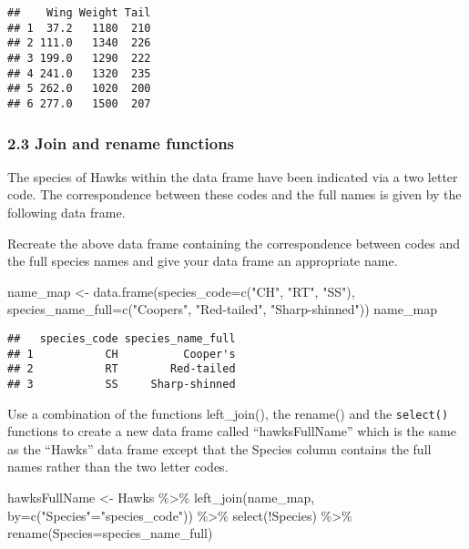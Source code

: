 \documentclass[
]{article}
\newenvironment{Shaded}{\begin{snugshade}}{\end{snugshade}}
\newcommand{\AttributeTok}[1]{\textcolor[rgb]{0.77,0.63,0.00}{#1}}
\newcommand{\FunctionTok}[1]{\textcolor[rgb]{0.00,0.00,0.00}{#1}}
\newcommand{\NormalTok}[1]{#1}
\newcommand{\OtherTok}[1]{\textcolor[rgb]{0.56,0.35,0.01}{#1}}
\newcommand{\SpecialCharTok}[1]{\textcolor[rgb]{0.00,0.00,0.00}{#1}}
\newcommand{\StringTok}[1]{\textcolor[rgb]{0.31,0.60,0.02}{#1}}
\begin{document}
\begin{verbatim}
##    Wing Weight Tail
## 1  37.2   1180  210
## 2 111.0   1340  226
## 3 199.0   1290  222
## 4 241.0   1320  235
## 5 262.0   1020  200
## 6 277.0   1500  207
\end{verbatim}

\hypertarget{join-and-rename-functions}{%
\subsubsection{2.3 Join and rename
functions}\label{join-and-rename-functions}}

The species of Hawks within the data frame have been indicated via a two
letter code. The correspondence between these codes and the full names
is given by the following data frame.

Recreate the above data frame containing the correspondence between
codes and the full species names and give your data frame an appropriate
name.

\begin{Shaded}
\begin{Highlighting}[]
\NormalTok{name\_map }\OtherTok{\textless{}{-}} \FunctionTok{data.frame}\NormalTok{(}\AttributeTok{species\_code=}\FunctionTok{c}\NormalTok{(}\StringTok{"CH"}\NormalTok{, }\StringTok{"RT"}\NormalTok{, }\StringTok{"SS"}\NormalTok{), }\AttributeTok{species\_name\_full=}\FunctionTok{c}\NormalTok{(}\StringTok{"Cooper\textquotesingle{}s"}\NormalTok{, }\StringTok{"Red{-}tailed"}\NormalTok{, }\StringTok{"Sharp{-}shinned"}\NormalTok{))}
\NormalTok{name\_map}
\end{Highlighting}
\end{Shaded}

\begin{verbatim}
##   species_code species_name_full
## 1           CH          Cooper's
## 2           RT        Red-tailed
## 3           SS     Sharp-shinned
\end{verbatim}

Use a combination of the functions left\_join(), the rename() and the
\texttt{select()} functions to create a new data frame called
``hawksFullName'' which is the same as the ``Hawks'' data frame except
that the Species column contains the full names rather than the two
letter codes.

\begin{Shaded}
\begin{Highlighting}[]
\NormalTok{hawksFullName }\OtherTok{\textless{}{-}}\NormalTok{ Hawks }\SpecialCharTok{\%\textgreater{}\%} \FunctionTok{left\_join}\NormalTok{(name\_map, }\AttributeTok{by=}\FunctionTok{c}\NormalTok{(}\StringTok{"Species"}\OtherTok{=}\StringTok{"species\_code"}\NormalTok{)) }\SpecialCharTok{\%\textgreater{}\%} \FunctionTok{select}\NormalTok{(}\SpecialCharTok{!}\NormalTok{Species) }\SpecialCharTok{\%\textgreater{}\%} \FunctionTok{rename}\NormalTok{(}\AttributeTok{Species=}\NormalTok{species\_name\_full)}
\end{Highlighting}
\end{Shaded}
\end{document}
